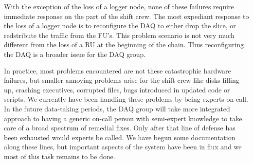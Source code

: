 With the exception of the loss of a logger node, none of these failures
require immediate response on the part of the shift crew.
The most expediant response to the loss of a logger node is
to reconfigure the DAQ to either drop the slice, 
or redstribute the traffic from the FU's.
This problem scenario is not very much different from the loss of a RU
at the beginning of the chain.
Thus reconfiguring the DAQ is a broader issue for the DAQ group.

In practice, most problems encountered are not these catastrophic hardware failures,
but smaller annoying problems arise for the shift crew like
disks filling up, crashing executives, corrupted files, 
bugs introduced in updated code or scripts.
We currently have been handling these problems by being experts-on-call.
In the future data-taking periods, the DAQ group will take more integrated 
approach to having a generic on-call person with semi-expert knowledge
to take care of a broad spectrum of remedial fixes.
Only after that line of defense has been exhausted would experts be called.
We have begun some documentation along these lines, but important
aspects of the system have been in flux and we most of this task 
remains to be done.













